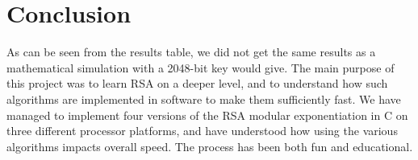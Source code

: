 \documentclass[twocolumn]{IEEEtran}
\begin{document}
\section{Conclusion}
As can be seen from the results table, we did not get the same results as a mathematical simulation with a 2048-bit key would give. The main purpose of this project was to learn RSA on a deeper level, and to understand how such algorithms are implemented in software to make them sufficiently fast.  We have managed to implement four versions of the RSA modular exponentiation in C on three different processor platforms, and have understood how using the various algorithms impacts overall speed. The process has been both fun and educational.



\end{document}
